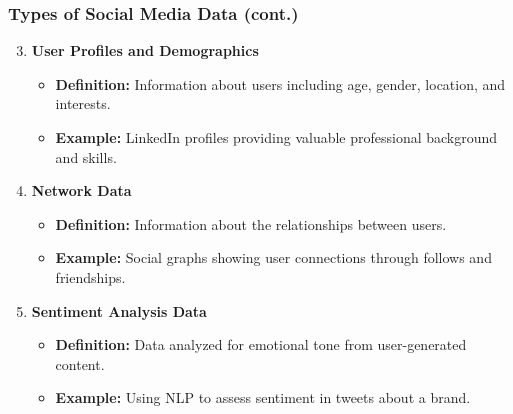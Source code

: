 \documentclass{beamer}
\begin{document}
\begin{frame}[fragile]
    \frametitle{Types of Social Media Data (cont.)}
    \begin{enumerate}
        \setcounter{enumi}{2} %
        \item \textbf{User Profiles and Demographics}
            \begin{itemize}
                \item \textbf{Definition:} Information about users including age, gender, location, and interests.
                \item \textbf{Example:} LinkedIn profiles providing valuable professional background and skills.
            \end{itemize}
        \item \textbf{Network Data}
            \begin{itemize}
                \item \textbf{Definition:} Information about the relationships between users.
                \item \textbf{Example:} Social graphs showing user connections through follows and friendships.
            \end{itemize}
        \item \textbf{Sentiment Analysis Data}
            \begin{itemize}
                \item \textbf{Definition:} Data analyzed for emotional tone from user-generated content.
                \item \textbf{Example:} Using NLP to assess sentiment in tweets about a brand.
            \end{itemize}
    \end{enumerate}
\end{frame}
\end{document}
